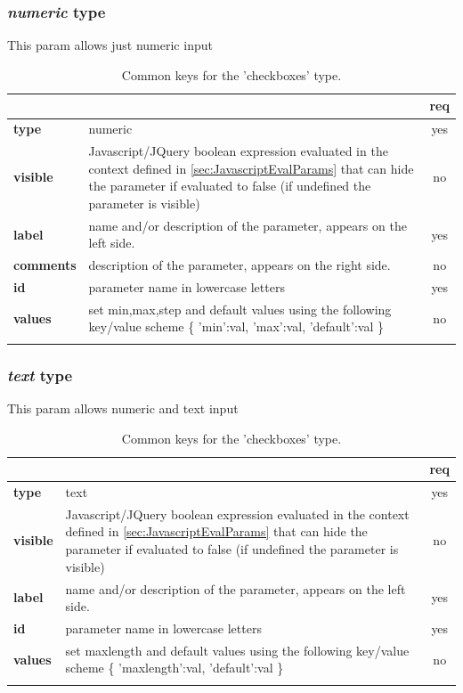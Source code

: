 \subsubsection{ \emph{numeric} type}

This param allows just numeric input
\begin{longtable}{|>{\bf}L{\linewidth}|L{\linewidth}|c|}
\hline
      &  & {\bf req} 
\tabularnewline \hline \hline
 type       & numeric   & yes \\ \hline
 visible    & Javascript/JQuery boolean expression evaluated in the context defined in \ref{sec:JavascriptEvalParams} that can hide the parameter
              if evaluated to false (if undefined the parameter is visible) & no \\ \hline
 label      & name and/or description of the parameter, appears on the left side. & yes \\ \hline
 comments   & description of the parameter, appears on the right side. & no  \\ \hline
 id         & parameter name in lowercase letters & yes \\ \hline
 values     & set min,max,step and default values using the following key/value scheme \{ 'min':val, 'max':val, 'default':val \} & no \\ \hline
\caption{Common keys for the 'checkboxes' type.}
\end{longtable}

\subsubsection{ \emph{text} type}

This param allows numeric and text input
\begin{longtable}{|>{\bf}L{\linewidth}|L{\linewidth}|c|}
\hline
      &  & {\bf req} 
\tabularnewline \hline \hline
 type       & text   & yes \\ \hline
 visible    & Javascript/JQuery boolean expression evaluated in the context defined in \ref{sec:JavascriptEvalParams} that can hide the parameter
              if evaluated to false (if undefined the parameter is visible) & no \\ \hline
 label      & name and/or description of the parameter, appears on the left side. & yes \\ \hline
 id         & parameter name in lowercase letters & yes \\ \hline
 values     & set maxlength and default values using the following key/value scheme \{ 'maxlength':val, 'default':val \} & no \\ \hline
\caption{Common keys for the 'checkboxes' type.}
\end{longtable}

